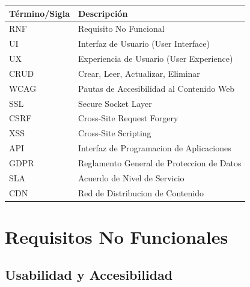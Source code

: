\documentclass[12pt, a4paper]{article}
\begin{document}
\begin{longtable}{|p{3cm}|p{10cm}|}
\hline
\textbf{Término/Sigla} & \textbf{Descripción} \\
\hline
\endhead

RNF & Requisito No Funcional \\
\hline
UI & Interfaz de Usuario (User Interface) \\
\hline
UX & Experiencia de Usuario (User Experience) \\
\hline
CRUD & Crear, Leer, Actualizar, Eliminar \\
\hline
WCAG & Pautas de Accesibilidad al Contenido Web \\
\hline
SSL & Secure Socket Layer \\
\hline
CSRF & Cross-Site Request Forgery \\
\hline
XSS & Cross-Site Scripting \\
\hline
API & Interfaz de Programacion de Aplicaciones \\
\hline
GDPR & Reglamento General de Proteccion de Datos \\
\hline
SLA & Acuerdo de Nivel de Servicio \\
\hline
CDN & Red de Distribucion de Contenido \\
\hline
\end{longtable}

\section{Requisitos No Funcionales}

\subsection{Usabilidad y Accesibilidad}
\end{document}
